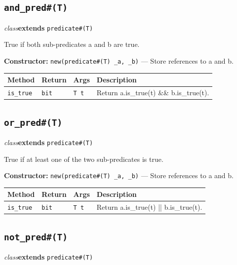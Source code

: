 \documentclass[11pt,letterpaper]{report}
\begin{document}
\subsection*{\texttt{and\_pred\#(T)}}
\noindent\small\textit{class}\quad \textbf{extends} \texttt{predicate\#(T)}\par

True if both sub-predicates a and b are true.

\noindent\textbf{Constructor:} \texttt{new(predicate\#(T) \_a, \_b)} --- Store references to a and b.

\begin{xltabular}{\linewidth}{>{\small}p{1.35in} >{\small}p{1.25in} >{\small}p{0.95in} >{\small}X}
\toprule
\textbf{Method} & \textbf{Return} & \textbf{Args} & \textbf{Description} \\
\midrule
\endhead
\bottomrule
\endfoot
\texttt{is\_true} & \texttt{bit} & \texttt{T t} & Return a.is\_true(t) \&\& b.is\_true(t). \\
\end{xltabular}

\subsection*{\texttt{or\_pred\#(T)}}
\noindent\small\textit{class}\quad \textbf{extends} \texttt{predicate\#(T)}\par

True if at least one of the two sub-predicates is true.

\noindent\textbf{Constructor:} \texttt{new(predicate\#(T) \_a, \_b)} --- Store references to a and b.

\begin{xltabular}{\linewidth}{>{\small}p{1.35in} >{\small}p{1.25in} >{\small}p{0.95in} >{\small}X}
\toprule
\textbf{Method} & \textbf{Return} & \textbf{Args} & \textbf{Description} \\
\midrule
\endhead
\bottomrule
\endfoot
\texttt{is\_true} & \texttt{bit} & \texttt{T t} & Return a.is\_true(t) || b.is\_true(t). \\
\end{xltabular}

\subsection*{\texttt{not\_pred\#(T)}}
\noindent\small\textit{class}\quad \textbf{extends} \texttt{predicate\#(T)}\par
\end{document}
